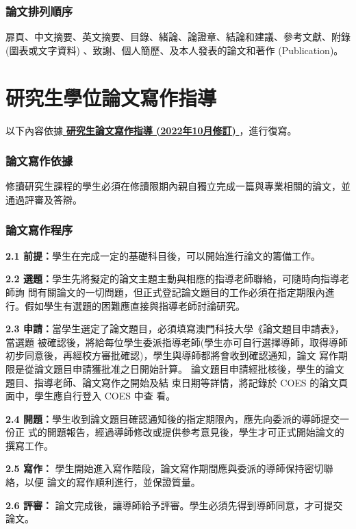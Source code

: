 \documentclass[
    writingLanguage=chinese, %
    addPageTitle=on,  %
    addDeclaration=on, %
    addMUSTlogo=on, %
    addFigTOC=on, %
    addTabTOC=on, %
    refIndent=off, %
    printMod=off, %
]{.def/must}
\begin{document}
\addinfo
\subsection{論文排列順序}
扉頁、中文摘要、英文摘要、目錄、緒論、論證章、結論和建議、參考文獻、附錄
(圖表或文字資料) 、致謝、個人簡歷、及本人發表的論文和著作 (Publication)。






\chapter{研究生學位論文寫作指導}
\noindent 以下內容依據\href{https://www.must.edu.mo/images/GSO/files/sgsdocument/GS002.pdf}{\textbf{ 研究生論文寫作指導 (2022年10月修訂) }}，進行復寫。

\subsection{論文寫作依據}
修讀研究生課程的學生必須在修讀限期內親自獨立完成一篇與專業相關的論文，並通過評審及答辯。
\subsection{論文寫作程序}

\noindent \textbf{2.1 前提：}學生在完成一定的基礎科目後，可以開始進行論文的籌備工作。

\noindent \textbf{2.2 選題：}學生先將擬定的論文主題主動與相應的指導老師聯絡，可隨時向指導老師詢
問有關論文的一切問題，但正式登記論文題目的工作必須在指定期限內進
行。假如學生有選題的困難應直接與指導老師討論研究。

\noindent \textbf{2.3 申請：}當學生選定了論文題目，必須填寫澳門科技大學《論文題目申請表》，當選題
被確認後，將給每位學生委派指導老師(學生亦可自行選擇導師，取得導師
初步同意後，再經校方審批確認)，學生與導師都將會收到確認通知，論文
寫作期限是從論文題目申請獲批准之日開始計算。
 論文題目申請經批核後，學生的論文題目、指導老師、論文寫作之開始及結
束日期等詳情，將記錄於 COES 的論文頁面中，學生應自行登入 COES 中查
看。

\noindent \textbf{2.4 開題：}學生收到論文題目確認通知後的指定期限內，應先向委派的導師提交一份正
式的開題報告，經過導師修改或提供參考意見後，學生才可正式開始論文的
撰寫工作。

\noindent \textbf{2.5 寫作：} 學生開始進入寫作階段，論文寫作期間應與委派的導師保持密切聯絡，以便
論文的寫作順利進行，並保證質量。

\noindent \textbf{2.6 評審：} 論文完成後，讓導師給予評審。學生必須先得到導師同意，才可提交論文。
\end{document}

